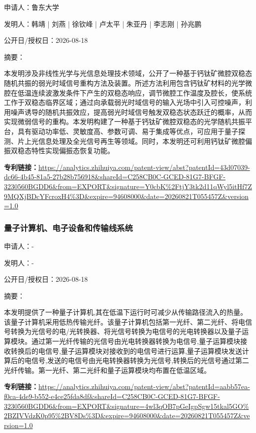 \documentclass[12pt,a4paper]{ctexart}
\begin{document}
申请人：鲁东大学

发明人：韩靖 | 刘燕 | 徐钦峰 | 卢太平 | 朱亚丹 | 李志刚 | 孙兆鹏

公开日/授权日：2026-08-18

摘要：

本发明涉及非线性光学与光信息处理技术领域，公开了一种基于钙钛矿微腔双稳态随机共振的弱光时域信号重构方法及装置。所述方法利用包含钙钛矿材料的光学微腔在低温连续波激发条件下产生的双稳态响应，调节微腔工作温度及腔长，使系统工作于双稳态临界区域；通过向承载弱光时域信号的输入光场中引入可控噪声，利用噪声诱导的随机共振效应，提高弱光时域信号触发双稳态状态跃迁的概率，从而实现微弱信号的重构。本发明构建了一种基于钙钛矿微腔双稳态的光学随机共振平台，具有驱动功率低、灵敏度高、参数可调、易于集成等优点，可应用于量子探测、片上光信息处理及全光信号再生等领域。同时，本发明还可利用钙钛矿微腔偏振双稳态特性实现偏振态恢复功能。

\noindent\textbf{专利链接：}\url{https://analytics.zhihuiya.com/patent-view/abst?patentId=43d07039-dc66-4b45-81a5-27b28b756918&shareId=C258CB0C-GCED-81G7-BFGF-3230560BGDD6&from=EXPORT&signature=Y0cbK%2FtjY3tk2d11qWyl5itHf7Z9MQXjBDcYFcroxH4%3D&expire=94608000&date=20260821T055457Z&version=1.0}

\subsubsection{ 量子计算机、电子设备和传输线系统 }

申请人：-

发明人：-

公开日/授权日：2026-08-18

摘要：

本发明提供了一种量子计算机,其在低温下运行时可减少从传输路径流入的热量。该量子计算机采用低热传输光纤。该量子计算机包括第一光纤、第二光纤、将电信号转换为光信号的电/光转换器、将光信号转换为电信号的光电转换器以及量子运算模块。通过第一光纤传输的光信号由光电转换器转换为电信号,量子运算模块接收转换后的电信号,量子运算模块对接收到的电信号进行运算,量子运算模块发送计算后的电信号,发送的电信号由光电转换器转换为光信号,转换后的光信号通过第二光纤传输。第一光纤、第二光纤和量子运算模块均布置在低温区域。

\noindent\textbf{专利链接：}\url{https://analytics.zhihuiya.com/patent-view/abst?patentId=aabb57ea-f0ca-4de9-b552-e4ce25fda8df&shareId=C258CB0C-GCED-81G7-BFGF-3230560BGDD6&from=EXPORT&signature=4wl3qOB7pGeIgpSgw15tkal5GO%2BZIVVdzK0p95%2BV8Ds%3D&expire=94608000&date=20260821T055457Z&version=1.0}
\end{document}
